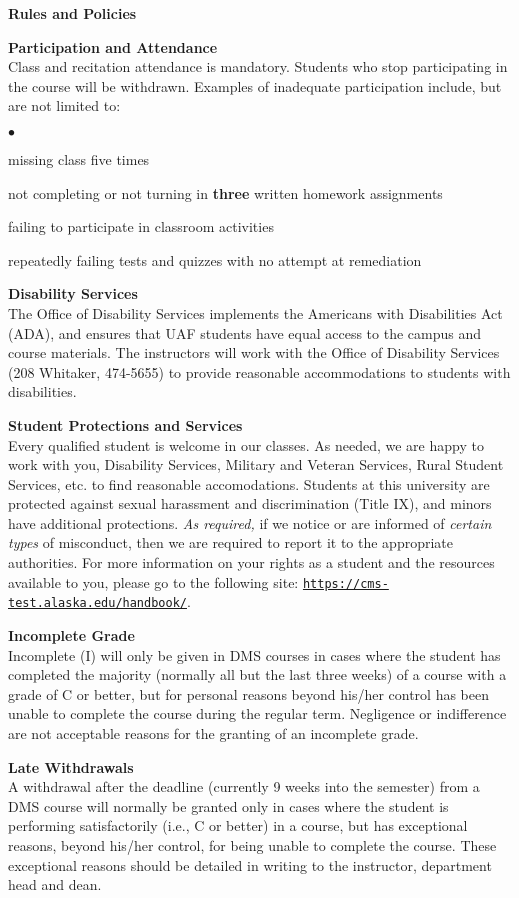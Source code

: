 \documentclass[12pt]{article}
\renewcommand{\emph}[1]{\textsf{\textbf{#1}}}
\newcommand{\localhead}[1]{\par\smallskip\textbf{#1}\nobreak\\}%
\def\heading#1{\localhead{\large\emph{#1}}}
\def\subheading#1{\localhead{\emph{#1}}}
\newenvironment{clist}%
{\bgroup\parskip 0pt\begin{list}{$\bullet$}{\partopsep 4pt\topsep 0pt\itemsep -2pt}}%
{\end{list}\egroup}%
\begin{document}
\heading{Rules and Policies}
\vskip -20pt
\subheading{Participation and Attendance}
Class and recitation attendance is mandatory. Students who stop participating in the course will be withdrawn. Examples of inadequate participation include,
but are not limited to:
\begin{clist}
\item missing class five times
\item not completing or not turning in \textbf{three} written homework assignments
\item failing to participate in classroom activities
\item repeatedly failing tests and quizzes with no attempt at remediation
\end{clist}

\subheading{Disability Services}
The Office of Disability Services implements the
Americans with Disabilities Act (ADA), and ensures that UAF students
have equal access to the campus and course materials. The instructors will work with
the Office of Disability Services (208 Whitaker, 474-5655) to provide
reasonable accommodations to students with disabilities.

\subheading{Student Protections and Services}
Every qualified student is welcome in our classes.  As needed, we are happy to work with you, Disability Services, Military and Veteran Services, Rural Student Services, etc. to find reasonable accomodations. Students at this university are protected against sexual harassment and discrimination (Title IX), and minors have additional protections. \textit{As required,} if we notice or are informed of \textit{certain types} of misconduct, then we are required to report it to the appropriate authorities.  For more information on your rights as a student and the resources available to you, please go to the following site: \href{https://cms-test.alaska.edu/handbook/}{\texttt{https://cms-test.alaska.edu/handbook/}}.

\subheading{Incomplete Grade} 
Incomplete (I) will only be given in DMS courses in cases where the student has completed the majority (normally all but the last three weeks) of a course with a grade of C or better, but for personal reasons beyond his/her control has been unable to complete the course during the regular term. Negligence or indifference are not acceptable reasons for the granting of an incomplete grade. 

\subheading{Late Withdrawals} 
A withdrawal after the deadline (currently 9 weeks into the semester) from a DMS course will normally be granted only in cases where the student is performing satisfactorily (i.e., C or better) in a course, but has exceptional reasons, beyond his/her control, for being unable to complete the course. These exceptional reasons should be detailed in writing to the instructor, department head and dean.
\end{document}
